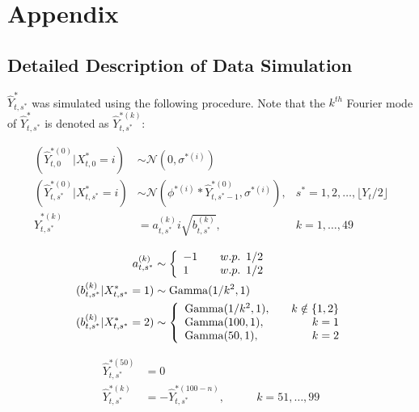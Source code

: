 
\renewcommand*{\thesubsection}{\Alph{subsection}}

\section*{Appendix}

\setcounter{subsection}{0}

\subsection{Detailed Description of Data Simulation}

$\hat{Y}^*_{t,s^*}$ was simulated using the following procedure. Note that the $k^{th}$ Fourier mode of $\hat{Y}^*_{t,s^*}$ is denoted as $\hat{Y}^{*(k)}_{t,s^*}$:

\begin{align*}
	(\hat{Y}^{*(0)}_{t,0}|X^*_{t,0} = i) &\sim \mathcal{N} \left(0, \sigma^{*(i)} \right) & \\
	(\hat{Y}^{*(0)}_{t,s^*}|X^*_{t,s^*} = i) &\sim \mathcal{N} \left(\phi^{*(i)} * \hat{Y}^{*(0)}_{t,s^*-1}, \sigma^{*(i)} \right), & s^* = 1,2,\ldots, \lfloor Y_t/2 \rfloor \\
	\hat{Y}^{*(k)}_{t,s^*} &= a_{t,s^*}^{(k)} i\sqrt{b^{(k)}_{t,s^*}}, & k = 1,\ldots,49 \\
\end{align*}
\begin{align*}
    a_{t,s^*}^{(k)} &\sim  \left\{\begin{array}{lr}
	-1 & \quad w.p. \enspace 1/2 \\
	1  & \quad w.p. \enspace 1/2
	\end{array}\right. \\
	(b^{(k)}_{t,s^*}|X^*_{t,s^*}  = 1) &\sim {\rm{Gamma}}(1/k^2, 1) \\
	(b^{(k)}_{t,s^*}|X^*_{t,s^*} = 2) &\sim \left\{\begin{array}{lr}
	{\rm{Gamma}}(1/k^2, 1), \quad & k \notin \{1,2\} \\
	{\rm{Gamma}}(100,1), & k = 1 \\
	{\rm{Gamma}}(50,1), & k = 2
	\end{array}\right. 
\end{align*}

\begin{align*}
    \hat{Y}^{*(50)}_{t,s^*} &= 0 & \\
	\hat{Y}^{*(k)}_{t,s^*}  &= -\hat{Y}^{*(100-n)}_{t,s^*}, & \qquad k = 51,\ldots,99
\end{align*}

